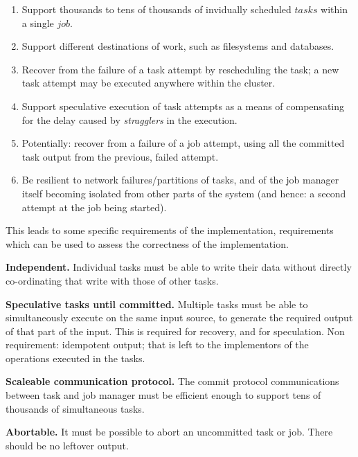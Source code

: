 \documentclass[conference]{IEEEtran}
\begin{document}
\begin{enumerate}

\item Support thousands to tens of thousands of invidually scheduled $tasks$
within a single $job$.

\item Support different destinations of work, such as filesystems and databases.

\item Recover from the failure of a task attempt by rescheduling the task;
a new task attempt may be executed anywhere within the cluster.

\item Support speculative execution of task attempts as a means of compensating for the
delay caused by \emph{stragglers} in the execution.

\item Potentially: recover from a failure of a job attempt, using all the committed
task output from the previous, failed attempt.

\item Be resilient to network failures/partitions of tasks, and of the job manager
itself becoming isolated from other parts of the system (and hence: a second
attempt at the job being started).

\end{enumerate}

This leads to some specific requirements of the implementation, requirements
which can be used to assess the correctness of the implementation.

\textbf{Independent.}
Individual tasks must be able to write their data without directly
co-ordinating that write with those of other tasks.

\textbf{Speculative tasks until committed.}
Multiple tasks must be able to simultaneously execute on the same input
source, to generate the required output of that part of the input.
This is required for recovery, and for speculation.
Non requirement: idempotent output;
that is left to the implementors of the operations executed in the tasks.

\textbf{Scaleable communication protocol.}
The commit protocol communications between task and job manager
must be efficient enough to support tens of thousands of simultaneous
tasks.

\textbf{Abortable.}
It must be possible to abort an uncommitted task or job.
There should be no leftover output.
\end{document}
